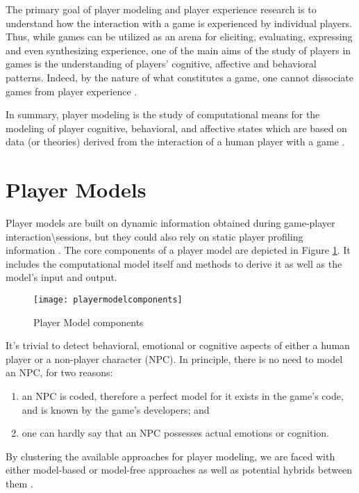 The primary goal of player modeling and player experience research is to understand how the interaction with a game is experienced by individual players. Thus, while games can be utilized as an arena for eliciting, evaluating, expressing and even synthesizing experience, one of the main aims of the study of players in games is the understanding of players’ cognitive, affective and behavioral patterns. Indeed, by the nature of what constitutes a game, one cannot dissociate games from player experience \citep{YannakakisPlayerModeling2013}.

In summary, player modeling is the study of computational means for the modeling of player cognitive, behavioral, and affective states which are based on data (or theories) derived from the interaction of a human player with a game \citep{YannakakisGameAIRevisited2012}.

\section{Player Models}
Player models are built on dynamic information obtained during game-player interaction\textbackslash{}sessions, but they could also rely on static player profiling information \citep{YannakakisPlayerModeling2013}.
The core components of a player model are depicted in Figure \ref{fig:pmc}. It includes the computational model itself and methods to derive it as well as the model’s input and output.

\begin{figure}
    \centering
      \texttt{[image: playermodelcomponents]}
      \caption{Player Model components}
      \label{fig:pmc}
  \end{figure}

  It’s trivial to detect behavioral, emotional or cognitive aspects of either a human player or a non-player character (NPC).
  In principle, there is no need to model an NPC, for two reasons:
  
  \begin{enumerate}
    \item an NPC is coded, therefore a perfect model for it exists in the game’s code, and is known by the game’s developers; and
    \item one can hardly say that an NPC possesses actual emotions or cognition.
  \end{enumerate}
  
By clustering the available approaches for player modeling, we are faced with either model-based or model-free  approaches as well as potential hybrids between them \citep{YannakakisPlayerModeling2013}.

